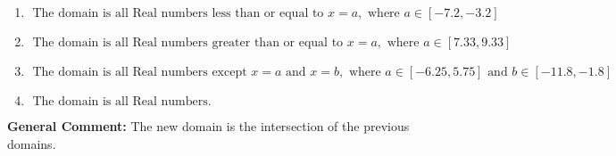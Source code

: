 \documentclass{extbook}[14pt]
\begin{document}
\begin{enumerate}
{\begin{enumerate}[label=\Alph*.]
\item \( \text{ The domain is all Real numbers less than or equal to } x = a, \text{ where } a \in [-7.2, -3.2] \)


\item \( \text{ The domain is all Real numbers greater than or equal to } x = a, \text{ where } a \in [7.33, 9.33] \)


\item \( \text{ The domain is all Real numbers except } x = a \text{ and } x = b, \text{ where } a \in [-6.25, 5.75] \text{ and } b \in [-11.8, -1.8] \)


\item \( \text{ The domain is all Real numbers. } \)


\end{enumerate}

\textbf{General Comment:} The new domain is the intersection of the previous domains.
}
\end{enumerate}
\end{document}
